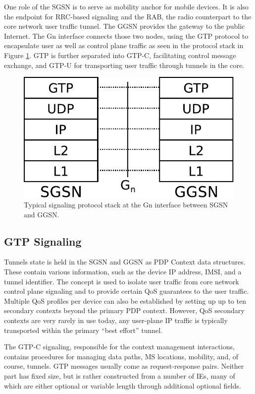 One role of the \ac{SGSN} is to serve as mobility anchor for mobile devices. It is also the endpoint for \ac{RRC}-based signaling and the \ac{RAB}, the radio counterpart to the core network user traffic tunnel. The \ac{GGSN} provides the gateway to the public Internet. The Gn interface connects those two nodes, using the \ac{GTP} protocol to encapsulate user as well as control plane traffic as seen in the protocol stack in Figure \ref{fig:signallingstack}. \ac{GTP} is further separated into GTP-C, facilitating control message exchange, and GTP-U for transporting user traffic through tunnels in the core.

\begin{figure}
	\centering
	\includegraphics[width=0.6\columnwidth]{images/IMC2013/signalling-stack.pdf}
	\caption{Typical signaling protocol stack at the Gn interface between \ac{SGSN} and \ac{GGSN}.}
	\label{fig:signallingstack}
\end{figure}


\subsection{GTP Signaling}

Tunnels state is held in the \ac{SGSN} and \ac{GGSN} as \ac{PDP} Context data structures. These contain various information, such as the device IP address, \ac{IMSI}, and a tunnel identifier. The concept is used to isolate user traffic from core network control plane signaling and to provide certain \ac{QoS} guarantees to the user traffic. Multiple \ac{QoS} profiles per device can also be established by setting up up to ten secondary contexts beyond the primary PDP context. However, \ac{QoS} secondary contexts are very rarely in use today, any user-plane IP traffic is typically transported within the primary ``best effort'' tunnel.

The GTP-C signaling, responsible for the context management interactions, contains procedures for managing data paths, \ac{MS} locations, mobility, and, of course, tunnels. \ac{GTP} messages usually come as request-response pairs. Neither part has fixed size, but is rather constructed from a number of \acp{IE}, many of which are either optional or variable length through additional optional fields.

